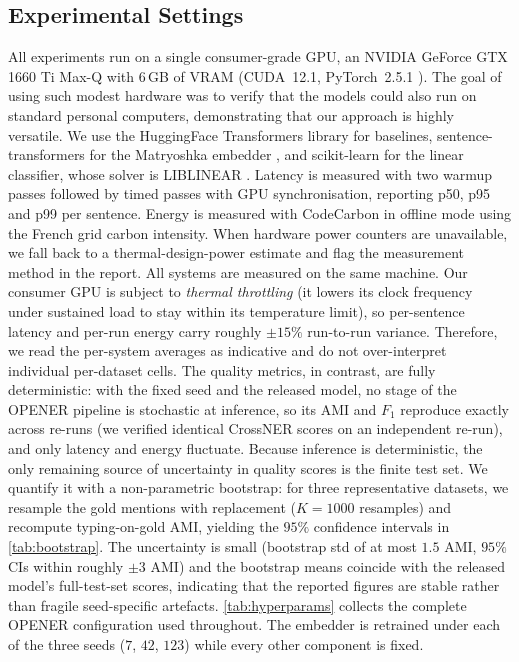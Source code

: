\subsection{Experimental Settings}
\label{sec:exp:impl}
All experiments run on a single consumer-grade GPU, an NVIDIA GeForce GTX 1660 Ti Max-Q with $6$\,GB of VRAM (CUDA~12.1, PyTorch~2.5.1 \cite{paszke2019pytorch}). The goal of using such modest hardware was to verify that the models could also run on standard personal computers, demonstrating that our approach is highly versatile.
We use the HuggingFace Transformers library \cite{wolf2020transformers} for baselines, sentence-transformers \cite{reimers2019sbert} for the Matryoshka embedder \cite{nussbaum2024nomic, kusupati2022matryoshka}, and scikit-learn \cite{pedregosa2011scikit} for the linear classifier, whose solver is LIBLINEAR \cite{fan2008liblinear}.
Latency is measured with two warmup passes followed by timed passes with GPU synchronisation, reporting p50, p95 and p99 per sentence.
Energy is measured with CodeCarbon \cite{luccioni2019quantifying} in offline mode using the French grid carbon intensity. When hardware power counters are unavailable, we fall back to a thermal-design-power estimate and flag the measurement method in the report.
All systems are measured on the same machine. Our consumer GPU is subject to \emph{thermal throttling} (it lowers its clock frequency under sustained load to stay within its temperature limit), so per-sentence latency and per-run energy carry roughly $\pm15\%$ run-to-run variance. Therefore, we read the per-system averages as indicative and do not over-interpret individual per-dataset cells.
The quality metrics, in contrast, are fully deterministic: with the fixed seed and the released model, no stage of the OPENER pipeline is stochastic at inference, so its AMI and $F_1$ reproduce exactly across re-runs (we verified identical CrossNER scores on an independent re-run), and only latency and energy fluctuate.
Because inference is deterministic, the only remaining source of uncertainty in quality scores is the finite test set. We quantify it with a non-parametric bootstrap: for three representative datasets, we resample the gold mentions with replacement ($K{=}1000$ resamples) and recompute typing-on-gold AMI, yielding the $95\%$ confidence intervals in \autoref{tab:bootstrap}. The uncertainty is small (bootstrap std of at most $1.5$ AMI, $95\%$ CIs within roughly $\pm 3$ AMI) and the bootstrap means coincide with the released model's full-test-set scores, indicating that the reported figures are stable rather than fragile seed-specific artefacts.
\autoref{tab:hyperparams} collects the complete OPENER configuration used throughout. The embedder is retrained under each of the three seeds ($7$, $42$, $123$) while every other component is fixed.

